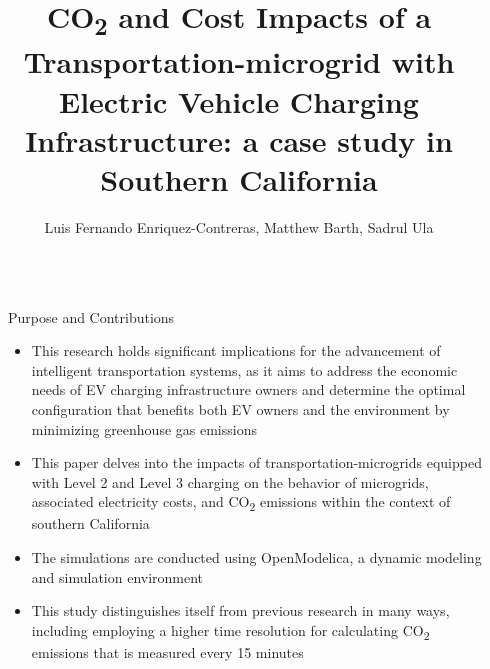 \documentclass[final, 20 pt]{beamer}
\title{CO\textsubscript{2} and Cost Impacts of a Transportation-microgrid with Electric Vehicle Charging Infrastructure: a case study in Southern California} %
\author{Luis Fernando Enriquez-Contreras, Matthew Barth, Sadrul Ula} %
\institute{Department of Electrical and Computer Engineering  \\ University of California, Riverside} %
\newlength{\sepwid}
\newlength{\onecolwid}
\begin{document}

\setlength{\belowcaptionskip}{2ex} %
\setlength\belowdisplayshortskip{2ex} %

\begin{frame}[t] %

\begin{columns}[t] %

\begin{column}{\sepwid}\end{column} %

\begin{column}{\onecolwid} %


\begin{alertblock}{Purpose and Contributions}
	\begin{itemize}
		\item This research holds significant implications for the advancement of intelligent transportation systems, as it aims to address the economic needs of EV charging infrastructure owners and determine the optimal configuration that benefits both EV owners and the environment by minimizing greenhouse gas emissions
		\item This paper delves into the impacts of transportation-microgrids equipped with Level 2 and Level 3 charging on the behavior of microgrids, associated electricity costs, and CO\textsubscript{2} emissions within the context of southern California
		\item The simulations are conducted using OpenModelica, a dynamic modeling and simulation environment
		\item This study distinguishes itself from previous research in many ways, including employing a higher time resolution for calculating CO\textsubscript{2} emissions that is measured every 15 minutes
	\end{itemize}
\end{alertblock}


\end{column}
\end{columns}
\end{frame}
\end{document}
